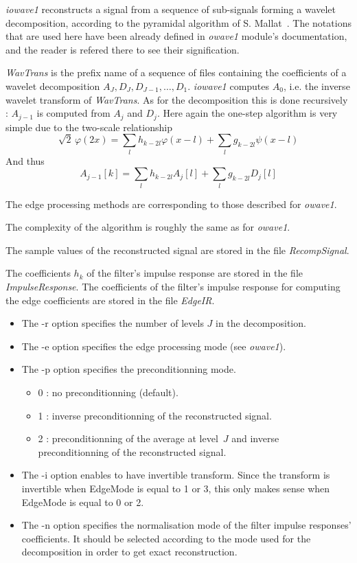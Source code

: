 \def\real{I\!\!R}


{\em iowave1} reconstructs a signal from a sequence of sub-signals forming a wavelet decomposition, according to the pyramidal algorithm of S. Mallat~\cite{mallat:theory}. 
The notations that are used here have been already defined in {\em owave1} module's documentation, and the reader is refered there to see their signification. 

{\em WavTrans} is the prefix name of a sequence of files containing the coefficients of a wavelet decomposition \( A_{J}, D_{J}, D_{J-1}, \ldots, D_{1} \). {\em iowave1} computes \( A_{0} \), i.e. the inverse wavelet transform of {\em WavTrans}. 
As for the decomposition this is done recursively : \( A_{j-1} \) is computed from \( A_{j} \) and \( D_{j} \). Here again the one-step algorithm is very simple due to the two-scale relationship 
\[
\sqrt{2} \, \varphi(2x) = \sum_{l} h_{k-2l} \varphi(x-l) + \sum_{l} g_{k-2l} \psi(x-l)
\]
And thus
\[
A_{j-1}[k] = \sum_{l} h_{k-2l} A_{j}[l] + \sum_{l} g_{k-2l} D_{j}[l]
\]

The edge processing methods are corresponding to those described for {\em owave1}.

The complexity of the algorithm is roughly the same as for {\em owave1}.

The sample values of the reconstructed signal are stored in the file {\em RecompSignal}. 

The coefficients \( h_{k} \) of the filter's impulse response are stored in the file {\em ImpulseResponse}. The coefficients of the filter's impulse response for computing the edge coefficients are stored in the file {\em EdgeIR}. 

\begin{itemize}
\item
The -r option specifies the number of levels $J$ in the decomposition.
\item
The -e option specifies the edge processing mode (see {\em owave1}).
\item
The -p option specifies the preconditionning mode.
\begin{itemize}
\item
0 : no preconditionning (default).
\item
1 : inverse preconditionning of the reconstructed signal.
\item
2 : preconditionning of the average at level~$J$ and inverse preconditionning of the reconstructed signal.
\end{itemize}
\item
The -i option enables to have invertible transform. Since the transform is invertible when EdgeMode is equal to 1 or 3, this only makes sense when EdgeMode is equal to 0 or 2. 
\item
The -n option specifies the normalisation mode of the filter impulse responses' coefficients. It should be selected according to the mode used for the decomposition in order to get exact reconstruction. 
\end{itemize}
